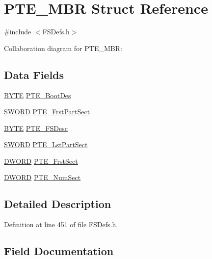 \hypertarget{struct_p_t_e___m_b_r}{}\section{P\+T\+E\+\_\+\+M\+B\+R Struct Reference}
\label{struct_p_t_e___m_b_r}


{\ttfamily \#include $<$F\+S\+Defs.\+h$>$}



Collaboration diagram for P\+T\+E\+\_\+\+M\+B\+R\+:
\subsection*{Data Fields}
\begin{DoxyCompactItemize}
\item 
\hyperlink{_generic_type_defs_8h_a4ae1dab0fb4b072a66584546209e7d58}{B\+Y\+T\+E} \hyperlink{struct_p_t_e___m_b_r_a2b6a2d53aa774a0746e26621b12ac83e}{P\+T\+E\+\_\+\+Boot\+Des}
\item 
\hyperlink{struct_s_w_o_r_d}{S\+W\+O\+R\+D} \hyperlink{struct_p_t_e___m_b_r_a2ef673faa087f3360fb554bafc8f114d}{P\+T\+E\+\_\+\+Frst\+Part\+Sect}
\item 
\hyperlink{_generic_type_defs_8h_a4ae1dab0fb4b072a66584546209e7d58}{B\+Y\+T\+E} \hyperlink{struct_p_t_e___m_b_r_a5e582f2a36228bc3d957449aad287586}{P\+T\+E\+\_\+\+F\+S\+Desc}
\item 
\hyperlink{struct_s_w_o_r_d}{S\+W\+O\+R\+D} \hyperlink{struct_p_t_e___m_b_r_a0bebc7b413ddd78e42e5fd36224ec0e7}{P\+T\+E\+\_\+\+Lst\+Part\+Sect}
\item 
\hyperlink{_generic_type_defs_8h_ad342ac907eb044443153a22f964bf0af}{D\+W\+O\+R\+D} \hyperlink{struct_p_t_e___m_b_r_a7c988f7cc39b0867c894425291cef76c}{P\+T\+E\+\_\+\+Frst\+Sect}
\item 
\hyperlink{_generic_type_defs_8h_ad342ac907eb044443153a22f964bf0af}{D\+W\+O\+R\+D} \hyperlink{struct_p_t_e___m_b_r_a4e55f721dcd1bbba2865333be9589a89}{P\+T\+E\+\_\+\+Num\+Sect}
\end{DoxyCompactItemize}


\subsection{Detailed Description}


Definition at line 451 of file F\+S\+Defs.\+h.



\subsection{Field Documentation}
\hypertarget{struct_p_t_e___m_b_r_a2b6a2d53aa774a0746e26621b12ac83e}{}
